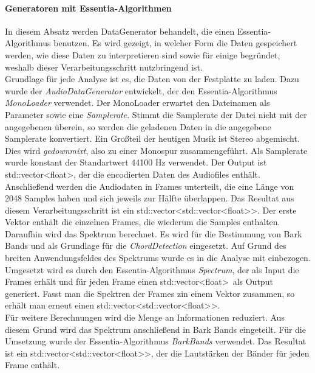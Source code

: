 \documentclass[11pt,a4paper]{article}
\begin{document}
\paragraph{Generatoren mit Essentia-Algorithmen}
In diesem Absatz werden DataGenerator behandelt, die einen Essentia-Algorithmus benutzen. Es wird gezeigt, in welcher Form die Daten gespeichert werden, wie diese Daten zu interpretieren sind sowie für einige begründet, weshalb dieser Verarbeitungsschritt nutzbringend ist.\\
Grundlage für jede Analyse ist es, die Daten von der Festplatte zu laden. Dazu wurde der \textit{AudioDataGenerator} entwickelt, der den Essentia-Algorithmus \textit{MonoLoader} verwendet. Der MonoLoader erwartet den Dateinamen als Parameter sowie eine \textit{Samplerate}. Stimmt die Samplerate der Datei nicht mit der angegebenen überein, so werden die geladenen Daten in die angegebene Samplerate konvertiert. Ein Großteil der heutigen Musik ist Stereo abgemischt. Dies wird \textit{gedownmixt}, also zu einer Monospur zusammengeführt. Als Samplerate wurde konstant der Standartwert 44100 Hz verwendet. Der Output ist std::vector\textless float\textgreater , der die encodierten Daten des Audiofiles enthält.\\
Anschließend werden die Audiodaten in Frames unterteilt, die eine Länge von 2048 Samples haben und sich jeweils zur Hälfte überlappen. Das Resultat aus diesem Verarbeitungsschritt ist ein std::vector\textless std::vector\textless float\textgreater\text{}\textgreater . Der erste Vektor enthält die einzelnen Frames, die wiederum die Samples enthalten.\\
Daraufhin wird das Spektrum berechnet. Es wird für die Bestimmung von Bark Bands und als Grundlage für die \textit{ChordDetection} eingesetzt. Auf Grund des breiten Anwendungsfeldes des Spektrums wurde es in die Analyse mit einbezogen. Umgesetzt wird es durch den Essentia-Algorithmus \textit{Spectrum}, der als Input die Frames erhält und für jeden Frame einen std::vector\textless float\textgreater\ als Output generiert. Fasst man die Spektren der Frames zin einem Vektor zusammen, so erhält man erneut einen std::vector\textless std::vector\textless float\textgreater\text{}\textgreater .\\
Für weitere Berechnungen wird die Menge an Informationen reduziert. Aus diesem Grund wird das Spektrum anschließend in Bark Bands eingeteilt. Für die Umsetzung wurde der Essentia-Algorithmus \textit{BarkBands} verwendet. Das Resultat ist ein std::vector<std::vector<float>\text{}>, der die Lautstärken der Bänder für jeden Frame enthält.\\
\end{document}
